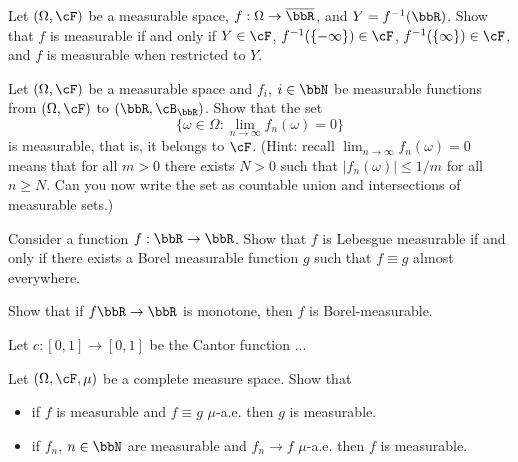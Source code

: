 \begin{problem}
    Let $(\Omega,\cF)$ be a measurable space, $f:\Omega\to \overline{\bbR}$, and $Y = f^{-1}(\bbR)$. Show that $f$ is measurable if and only if $Y\in \cF$, $f^{-1}(\{-\infty\})\in\cF$, $f^{-1}(\{\infty\})\in \cF$, and $f$ is measurable when restricted to $Y$.  
\end{problem}

\begin{problem}
    Let $(\Omega,\cF)$ be a measurable space and $f_i$, $i\in \bbN$ be measurable functions from $(\Omega,\cF)$ to $(\bbR,\cB_\bbR)$. Show that the set 
    \begin{equation*}
        \{\omega\in \Omega: \lim_{n\to \infty} f_n(\omega) = 0\}
    \end{equation*}
    is measurable, that is, it belongs to $\cF$.
    (Hint: recall $\lim_{n\to \infty} f_n(\omega) = 0$ means that for all $m>0$ there exists $N>0$ such that $|f_n(\omega)|\leq 1/m$ for all $n\geq N$. Can you now write the set as countable union and intersections of measurable sets.)
\end{problem}

\begin{problem} Consider a function $f:\bbR\to \bbR$. Show that $f$ is Lebesgue measurable if and only if there exists a Borel measurable function $g$ such that $f\equiv g$ almost everywhere.
\end{problem}

\begin{problem} Show that if $f\bbR\to\bbR$ is monotone, then $f$ is Borel-measurable.
\end{problem}

\begin{problem} Let $c:[0,1]\to [0,1]$ be the Cantor function ...
    
\end{problem}

\begin{problem} Let $(\Omega,\cF,\mu)$ be a complete measure space. Show that 
\begin{itemize}
    \item if $f$ is measurable and $f\equiv g$ $\mu$-a.e. then $g$ is measurable.
    \item if $f_n$, $n\in \bbN$ are measurable and $f_n\to f$ $\mu$-a.e. then $f$ is measurable.
\end{itemize}
    
\end{problem}